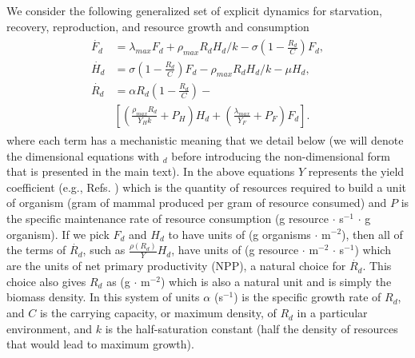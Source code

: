 \documentclass[twocolumn,preprintnumbers,amsmath,amssymb,superscriptaddress]{revtex4}
\begin{document}
We consider the following generalized set of explicit dynamics for starvation, recovery, reproduction, and resource growth and consumption
\begin{align}
\begin{split}
\dot{F_{d}} &= \lambda_{max} F_{d} + \rho_{max}R_{d}H_{d}/k - \sigma \left(1-\frac{R_{d}}{C}\right)F_{d},  \\
\dot{H_{d}} &= \sigma \left(1-\frac{R_{d}}{C}\right)F_{d} - \rho_{max}R_{d} H_{d}/k - \mu H_{d},  \\
\dot{R_{d}} &= \alpha R_{d}\left(1-\frac{R_{d}}{C}\right) -\\
& \left[\left(\frac{\rho_{max}R_{d}}{Y_{H}k}+P_{H}\right)H_{d}+\left(\frac{\lambda_{max}}{Y_{F}}+P_{F}\right)F_{d}\right].
\end{split}
\end{align}
where each term has a mechanistic meaning that we detail below (we will denote the dimensional equations with $_{d}$ before introducing the non-dimensional form that is presented in the main text). In the above equations $Y$ represents the yield coefficient (e.g., Refs. \citep{pirt,Heijnen}) which is the quantity of resources required to build a unit of organism (gram of mammal produced per gram of resource consumed) and $P$ is the specific maintenance rate of resource consumption (g resource $\cdot$ s$^{-1}$ $\cdot$ g organism). If we pick $F_{d}$ and $H_{d}$ to have units of (g organisms $\cdot$ m$^{-2}$), then all of the terms of $\dot{R_{d}}$, such as $\frac{\rho\left(R_{d}\right)}{Y}H_{d}$, have units of (g resource $\cdot$ m$^{-2}$ $\cdot$ s$^{-1}$) which are the units of net primary productivity (NPP), a natural choice for $\dot{R_{d}}$. This choice also gives $R_{d}$ as (g $\cdot$ m$^{-2}$) which is also a natural unit and is simply the biomass density. In this system of units $\alpha$ (s$^{-1}$) is the specific growth rate of $R_{d}$, and $C$ is the carrying capacity, or maximum density, of $R_{d}$ in a particular environment, and $k$ is the half-saturation constant (half the density of resources that would lead to maximum growth).
\end{document}

